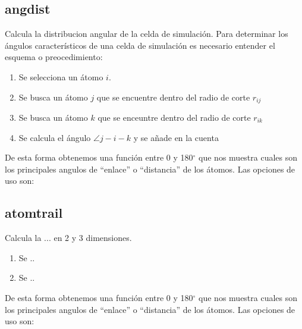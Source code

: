 \subsection{angdist}
Calcula la distribucion angular de la celda de simulaci\'on. Para determinar los \'angulos caracter\'isticos de una celda de simulaci\'on es necesario entender el esquema o preocedimiento:
\begin{enumerate}
 \item Se selecciona un \'atomo $i$.
 \item Se busca un \'atomo $j$ que se encuentre dentro del radio de corte $r_{ij}$
 \item Se busca un \'atomo $k$ que se enceuntre dentro del radio de corte $r_{ik}$
 \item Se calcula el \'angulo  $\angle j-i-k$ y se a\~nade en la cuenta
\end{enumerate}

De esta forma obtenemos una funci\'on entre 0 y 180$^\circ$ que nos muestra cuales son los principales angulos de ``enlace'' o ``distancia'' de los \'atomos. Las opciones de uso son:


\subsection{atomtrail}
Calcula la ... en 2 y 3 dimensiones.
\begin{enumerate}
 \item Se ..
 \item Se ..
\end{enumerate}

De esta forma obtenemos una funci\'on entre 0 y 180$^\circ$ que nos muestra cuales son los principales angulos de ``enlace'' o ``distancia'' de los \'atomos. Las opciones de uso son:

